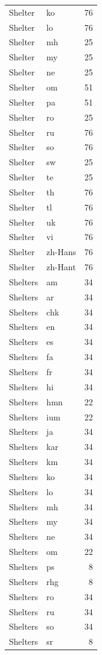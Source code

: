 \begin{longtable}{p{3cm} p{3cm} r}
Shelter & ko & 76 \\
Shelter & lo & 76 \\
Shelter & mh & 25 \\
Shelter & my & 25 \\
Shelter & ne & 25 \\
Shelter & om & 51 \\
Shelter & pa & 51 \\
Shelter & ro & 25 \\
Shelter & ru & 76 \\
Shelter & so & 76 \\
Shelter & sw & 25 \\
Shelter & te & 25 \\
Shelter & th & 76 \\
Shelter & tl & 76 \\
Shelter & uk & 76 \\
Shelter & vi & 76 \\
Shelter & zh-Hans & 76 \\
Shelter & zh-Hant & 76 \\
Shelters & am & 34 \\
Shelters & ar & 34 \\
Shelters & chk & 34 \\
Shelters & en & 34 \\
Shelters & es & 34 \\
Shelters & fa & 34 \\
Shelters & fr & 34 \\
Shelters & hi & 34 \\
Shelters & hmn & 22 \\
Shelters & ium & 22 \\
Shelters & ja & 34 \\
Shelters & kar & 34 \\
Shelters & km & 34 \\
Shelters & ko & 34 \\
Shelters & lo & 34 \\
Shelters & mh & 34 \\
Shelters & my & 34 \\
Shelters & ne & 34 \\
Shelters & om & 22 \\
Shelters & ps & 8 \\
Shelters & rhg & 8 \\
Shelters & ro & 34 \\
Shelters & ru & 34 \\
Shelters & so & 34 \\
Shelters & sr & 8 \\

\end{longtable}
